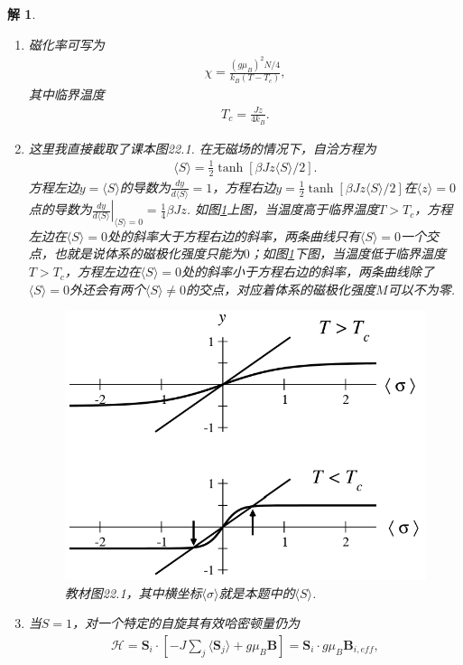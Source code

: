 \documentclass[UTF8,10pt,a4paper]{article}
\theoremstyle{Problem}
\theoremstyle{Solution}
\newtheorem*{sol}{解}
\begin{document}
\begin{sol}
\begin{enumerate}
\begin{align}
        \end{align}
        \item[(d)] 磁化率可写为
        \begin{align}
            \chi=\frac{(g\mu_B)^2N/4}{k_B(T-T_c)},
        \end{align}
        其中临界温度
        \begin{align}
            T_c=\frac{Jz}{4k_B}.
        \end{align}
        \item[(e)] 这里我直接截取了课本图22.1. 在无磁场的情况下，自洽方程为
        \begin{align}
            \langle S\rangle=\frac{1}{2}\tanh[\beta Jz\langle S\rangle/2].
        \end{align}
        方程左边$y=\langle S\rangle$的导数为$\frac{dy}{d\langle S\rangle}=1$，方程右边$y=\frac{1}{2}\tanh[\beta Jz\langle S\rangle/2]$在$\langle z\rangle=0$点的导数为$\left.\frac{dy}{d\langle S\rangle}\right\rvert_{\langle S\rangle=0}=\frac{1}{4}\beta Jz$. 如图\ref{3e}上图，当温度高于临界温度$T>T_c$，方程左边在$\langle S\rangle=0$处的斜率大于方程右边的斜率，两条曲线只有$\langle S\rangle=0$一个交点，也就是说体系的磁极化强度只能为$0$；如图\ref{3e}下图，当温度低于临界温度$T>T_c$，方程左边在$\langle S\rangle=0$处的斜率小于方程右边的斜率，两条曲线除了$\langle S\rangle=0$外还会有两个$\langle S\rangle\neq 0$的交点，对应着体系的磁极化强度$M$可以不为零.
        \begin{figure}[h]
            \centering
            \includegraphics[width=.5\textwidth]{3e.png}
            \caption{教材图22.1，其中横坐标$\langle\sigma\rangle$就是本题中的$\langle S\rangle$.}
            \label{3e}
        \end{figure}
        \item[(f)] 当$S=1$，对一个特定的自旋其有效哈密顿量仍为
        \begin{align}
            \mathcal{H}=\bm{S}_i\cdot\left[-J\sum_j\langle\bm{S}_j\rangle+g\mu_B\bm{B}\right]=\bm{S}_i\cdot g\mu_B\bm{B}_{i,eff},
        \end{align}

\end{enumerate}
\end{sol}
\end{document}
